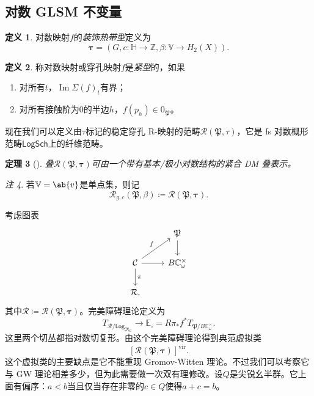 \documentclass{amsart}
\newtheorem{thm}{定理}[section]
\theoremstyle{definition}
\newtheorem{defn}[thm]{定义}
\theoremstyle{remark}
\newtheorem{rmk}[thm]{注}
\theoremstyle{plain}
\theoremstyle{definition}
\theoremstyle{remark}
\DeclareMathOperator{\Ima}{Im}
\newcommand{\C}{\mathbb{C}}
\newcommand{\Z}{\mathbb{Z}}
\newcommand{\E}{\mathbb{E}}
\newcommand{\V}{\mathbb{V}}
\renewcommand{\H}{\mathbb{H}}
\newcommand{\mc}[1]{\mathcal{#1}}
\newcommand{\mf}[1]{\mathfrak{#1}}
\newcommand{\mr}[1]{\mathrm{#1}}
\newcommand{\ms}[1]{\mathsf{#1}}
\newcommand{\1}{\mathbf{1}}
\newcommand{\2}{\mathbf{2}}
\newcommand{\3}{\mathbf{3}}
\newcommand{\vir}{\mr{vir}}
\begin{document}
\subsection{对数 GLSM 不变量}%
\label{sub:Log GLSM invariants}

\begin{defn}
    对数映射\(f\)的\textit{装饰热带型}定义为
    \[ \bm{\tau} = (G, c \colon \H \to \Z, \beta \colon \V \to H_2(X)). \]
\end{defn}

\begin{defn}
    称对数映射或穿孔映射\(f\)是\textit{紧型}的，如果
    \begin{enumerate}
        \item 对所有\(t\)，\(\Ima \Sigma(f)_t\)有界；
        \item 对所有接触阶为\(0\)的半边\(h\)，\(f(p_h) \in 0_{\mf{P}}\)。
    \end{enumerate}
\end{defn}

现在我们可以定义由\(\tau\)标记的稳定穿孔 R-映射的范畴\(\mc{R}(\mf{P}, \tau)\)，它是 fs 对数概形范畴\(\ms{LogSch}\)上的纤维范畴。

\begin{thm}[{\cite{CJR2021,CJRpunctured}}]
    叠\(\mc{R}(\mf{P},\bm{\tau})\)可由一个带有基本/极小对数结构的紧合 DM 叠表示。
\end{thm}

\begin{rmk}
    若\(\V = \ab\{v\}\)是单点集，则记
    \[ \mc{R}_{g, c}(\mf{P}, \beta) \coloneqq \mc{R}(\mf{P}, \bm{\tau}). \]
\end{rmk}

考虑图表
\begin{equation*}
\begin{tikzcd}
    & \mf{P} \ar{d} \\
    \mc{C} \ar{ur}{f} \ar{d}{\pi} \ar{r} & B \C_{\omega}^{\times} \\
    \mc{R},
\end{tikzcd}
\end{equation*}
其中\(\mc{R} \coloneqq \mc{R}(\mf{P}, \bm{\tau})\)。完美障碍理论定义为
\[ T_{\mc{R}/\ms{Log}_{\mf{M}_G}} \to \E_{\square} = R \pi_* f^* T_{\mf{P}/B\C_{\omega}^{\times}}. \]
这里两个切丛都指对数切复形。由这个完美障碍理论得到典范虚拟类
\[ [\mc{R}(\mf{P}, \bm{\tau})]^{\vir}. \]
这个虚拟类的主要缺点是它不能重现 Gromov-Witten 理论。不过我们可以考察它与 GW 理论相差多少，但为此需要做一次双有理修改。设\(Q\)是尖锐幺半群。它上面有偏序：\(a < b\)当且仅当存在非零的\(c \in Q\)使得\(a+c = b\)。
\end{document}
